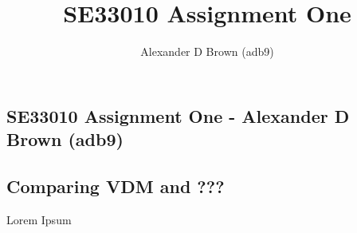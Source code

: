 \documentclass[a4paper, 10pt, notitlepage]{article}
\title{SE33010 Assignment One}
\author{Alexander D Brown (adb9)}
\begin{document}
\begin{centering}
\section*{SE33010 Assignment One - Alexander D Brown (adb9)}
\subsection*{Comparing VDM and ???}
\end{centering}

Lorem Ipsum
\end{document}
